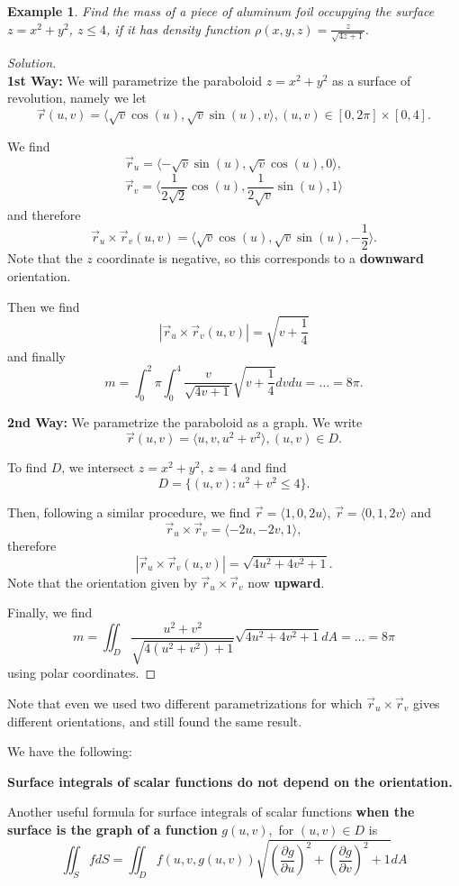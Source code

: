 \documentclass[12pt]{article}
\newcommand{\p}{\partial}
\newcommand{\vr}{\vec{r}{}}
\renewcommand{\lg}{\langle}
\newcommand{\rg}{\rangle}
\newcommand{\rcross}{\vr_u\times\vr_v}
\let\sq \sqrt
\newenvironment{solution}
  {\begin{proof}[Solution]}
  {\end{proof}
  
  }
\newtheorem{example}{Example}
\begin{document}
\begin{example} Find the mass of a piece of aluminum foil occupying the surface $z=x^2+y^2$, $z\leq 4$, if it has density function $\rho(x,y,z)=\frac{z}{\sqrt{4z+1}}.$
\end{example}
\begin{solution}${}$\\
\noindent\textbf{1st Way:} We will parametrize the paraboloid $z=x^2+y^2$ as a surface of revolution, namely we let $$\vr(u,v)=\lg \sqrt{v}\cos(u),\sqrt{v}\sin(u),v\rg, (u,v)\in [0,2\pi]\times [0,4].$$

We find $$\vr_u=\lg -\sqrt{v}\sin(u),\sqrt{v}\cos(u),0\rg,$$
$$\vr_v=\lg \frac{1}{2\sqrt{2}}\cos(u),\frac{1}{2\sqrt{v}}\sin(u),1\rg$$
and therefore
$$\rcross(u,v)=\lg \sqrt{v}\cos(u),\sq{v}\sin(u),-\frac{1}{2}\rg.$$
Note that the $z$ coordinate is negative, so this corresponds to a \textbf{downward} orientation.

Then we find $$|\rcross(u,v)|=\sqrt{v+\frac{1}{4}}$$ and finally $$m=\int_0^2\pi\int_0^4 \frac{v}{\sq{4v+1}}\sq{v+\frac{1}{4}}dvdu=\dots=8\pi.$$

\vspace {.2 in}


\noindent\textbf{2nd Way:} We parametrize the paraboloid as a graph. We write $$\vr(u,v)=\lg u,v,u^2+v^2\rg, (u,v)\in D.$$

To find $D$, we intersect $z=x^2+y^2$, $z=4$ and find $$D=\{(u,v):u^2+v^2\leq 4\}.$$ 

Then, following a similar procedure, we find $\vr=\lg 1,0,2u\rg$, $\vr=\lg 0,1,2v\rg$ and $$\rcross=\lg -2u, -2v, 1\rg,$$ therefore $$|\rcross(u,v)|=\sq{4u^2+4v^2+1}.$$ Note that the orientation given by $\rcross$ now \textbf{upward}.

 Finally, we find $$m =\iint_D \frac{u^2+v^2}{\sq{4(u^2+v^2)+1}}\sq{4u^2+4v^2+1}dA=\dots=8\pi$$ 
using polar coordinates.
\end{solution}

Note that even we used two different parametrizations for which $\rcross$ gives different orientations, and still found the same result.

\vspace {.2 in}


We have the following:

\textbf{Surface integrals of scalar functions do not depend on the orientation.}

\vspace {.2 in}


Another useful formula for surface integrals of scalar functions\textbf{ when the surface is the graph of a function }$g(u,v),$ for $(u,v)\in D$ is $$\iint_S f dS=\iint_Df(u,v,g(u,v))\sq{\left( \frac{\p g }{\p u}\right )^2+\left( \frac{\p g}{\p v}\right )^2+1}dA$$
\end{document}
